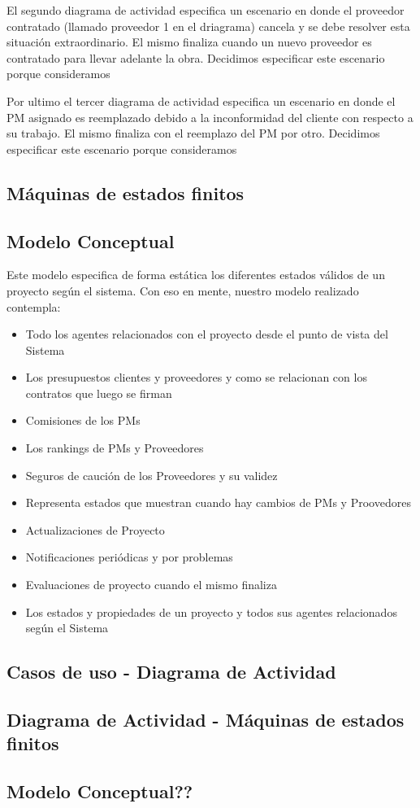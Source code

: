 El segundo diagrama de actividad especifica un escenario en donde el proveedor contratado (llamado proveedor 1 en el driagrama) cancela y se debe resolver esta situación extraordinario. El mismo finaliza cuando un nuevo proveedor es contratado para llevar adelante la obra. Decidimos especificar este escenario porque consideramos

Por ultimo el tercer diagrama de actividad especifica un escenario en donde el PM asignado es reemplazado debido a la inconformidad del cliente con respecto a su trabajo. El mismo finaliza con el reemplazo del PM por otro. Decidimos especificar este escenario porque consideramos

\subsection{Máquinas de estados finitos}

\subsection{Modelo Conceptual}

Este modelo especifica de forma estática los diferentes estados válidos de un proyecto según el sistema. Con eso en mente, nuestro modelo realizado contempla:

\begin{itemize}
	\item Todo los agentes relacionados con el proyecto desde el punto de vista del Sistema
	\item Los presupuestos clientes y proveedores y como se relacionan con los contratos que luego se firman
	\item Comisiones de los PMs
	\item Los rankings de PMs y Proveedores
	\item Seguros de caución de los Proveedores y su validez
	\item Representa estados que muestran cuando hay cambios de PMs y Proovedores
	\item Actualizaciones de Proyecto
	\item Notificaciones periódicas y por problemas
	\item Evaluaciones de proyecto cuando el mismo finaliza
	\item Los estados y propiedades de un proyecto y todos sus agentes relacionados según el Sistema
\end{itemize}

\subsection{Casos de uso - Diagrama de Actividad}

\subsection{Diagrama de Actividad - Máquinas de estados finitos}


\subsection{Modelo Conceptual??}
